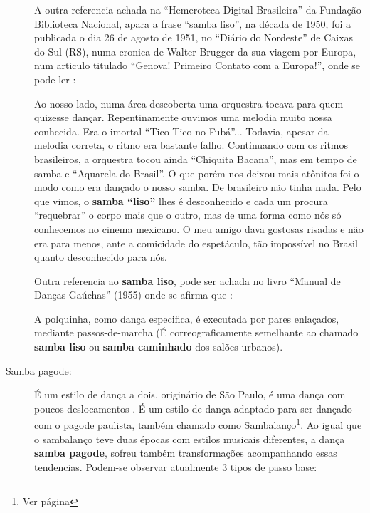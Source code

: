 \begin{description}
A outra referencia achada na ``Hemeroteca Digital Brasileira'' da Fundação Biblioteca Nacional,
apara a frase ``samba liso'', na década de 1950, foi a publicada o dia 26 de agosto de 1951,
no ``Diário do Nordeste'' de Caixas do Sul (RS), numa cronica de Walter Brugger da sua viagem por Europa,
num articulo titulado ``Genova! Primeiro Contato com a Europa!'',
onde se pode ler \cite[pp. 10]{nordestesambalisocronica}:
\begin{citando}
Ao nosso lado, numa área 
descoberta uma orquestra tocava para
quem quizesse dançar.
Repentinamente ouvimos uma melodia muito
nossa conhecida. Era o imortal ``Tico-Tico no Fubá''... Todavia,
apesar da melodia correta, o ritmo
era bastante falho. Continuando 
com os ritmos brasileiros, a orquestra 
tocou ainda ``Chiquita Bacana'',
mas em tempo de samba e ``Aquarela do Brasil''.
O que porém nos 
deixou mais atônitos foi o modo como 
era dançado o nosso samba. De 
brasileiro não tinha nada. Pelo que 
vimos, o \textbf{samba ``liso''} lhes é desconhecido 
e cada um procura ``requebrar'' o corpo mais que o outro,
mas de uma forma como nós só 
conhecemos no cinema mexicano. 
O meu amigo dava gostosas risadas e não era para menos,
ante a comicidade do espetáculo, tão 
impossível no Brasil quanto desconhecido para nós.
\end{citando}


Outra referencia ao \textbf{samba liso}, pode ser achada no livro ``Manual de Danças Gaúchas'' (1955)
onde se afirma que \cite[pp. 77]{cortesmanual}: 
\begin{citando}
A polquinha, como dança especifica, é executada por pares enlaçados,
mediante passos-de-marcha (É correograficamente  semelhante ao chamado 
\textbf{samba liso} ou \textbf{samba caminhado} dos salões urbanos).
\end{citando}


\item[Samba pagode:] 
É um estilo de dança a dois, originário de São Paulo, 
é uma dança com poucos deslocamentos \cite[pp. 134]{perna2002samba}.
É um estilo de dança adaptado para ser dançado com o pagode paulista,
também chamado como Sambalanço\footnote{Ver página \pageref{ref:sambalanco}}.
Ao igual que o sambalanço teve duas épocas com estilos musicais diferentes,
a dança \textbf{samba pagode}, sofreu também transformações acompanhando essas tendencias.
Podem-se observar atualmente 3 tipos de passo base: 


\end{description}

